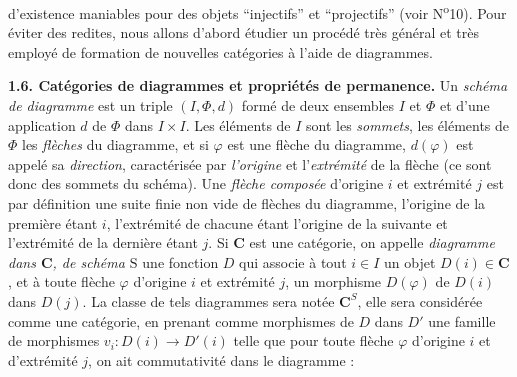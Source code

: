 
\noindent d'existence maniables pour des objets ``injectifs'' et
``projectifs'' (voir N\textsuperscript{o}10). Pour éviter des redites, nous
allons d'abord étudier un procédé très général et très employé de formation de
nouvelles catégories à l'aide de diagrammes.

\noindent\textbf{1.6. Catégories de diagrammes et propriétés de permanence.}
Un \textit{schéma de diagramme} est un triple $(I,\Phi,d)$ formé de deux
ensembles $I$ et $\Phi$ et d'une application $d$ de $\Phi$ dans $I\times I$.
Les éléments de $I$ sont les \textit{sommets}, les éléments de $\Phi$ les
\textit{flèches} du diagramme, et si $\varphi$ est une flèche du diagramme,
$d(\varphi)$ est appelé sa \textit{direction}, caractérisée par
\textit{l'origine} et l'\textit{extrémité} de la flèche (ce sont donc des
sommets du schéma).
Une \textit{flèche composée} d'origine $i$ et extrémité $j$ est par définition
une suite finie non vide de flèches du diagramme, l'origine de la première
étant $i$, l'extrémité de chacune étant l'origine de la suivante et
l'extrémité de la dernière étant $j$.
Si $\mathbf{C}$ est une catégorie, on appelle \textit{diagramme dans $\mathbf{C}$, de schéma
$\mathrm{S}$} une fonction $D$ qui associe à tout $i\in I$ un objet $D(i)\in \mathbf{C}$, et à
toute flèche $\varphi$ d'origine $i$ et extrémité $j$, un morphisme
$D(\varphi)$ de $D(i)$ dans $D(j)$. La classe de tels diagrammes sera notée
$\mathbf{C}^S$, elle sera considérée comme une catégorie, en prenant comme morphismes
de $D$ dans $D'$ une famille de morphismes
$v_i:D(i)\to D'(i)$ telle que pour toute flèche $\varphi$
d'origine $i$ et d'extrémité $j$, on ait commutativité dans le diagramme :

